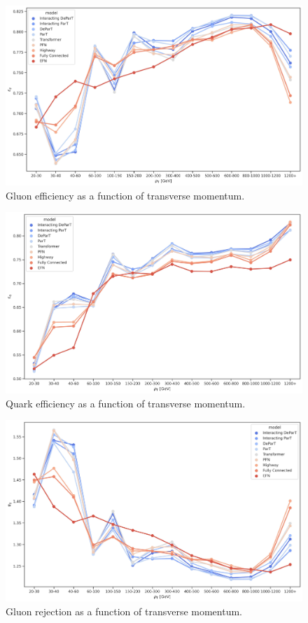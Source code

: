 \begin{figure}[htb]
    \centering
    \includegraphics[width=1\linewidth]{src/plots/results/pT_dep/gluon_efficiency.jpg}
    \caption{Gluon efficiency as a function of transverse momentum.}
    \label{fig:gluon_eff_pt}
\end{figure}

\begin{figure}[htb]
    \centering
    \includegraphics[width=1\linewidth]{src/plots/results/pT_dep/quark_efficiency.jpg}
    \caption{Quark efficiency as a function of transverse momentum.}
    \label{fig:quark_eff_pt}
\end{figure}

\begin{figure}[htb]
    \centering
    \includegraphics[width=1\linewidth]{src/plots/results/pT_dep/gluon_rejection.jpg}
    \caption{Gluon rejection as a function of transverse momentum.}
    \label{fig:gluon_rej_pt}
\end{figure}

